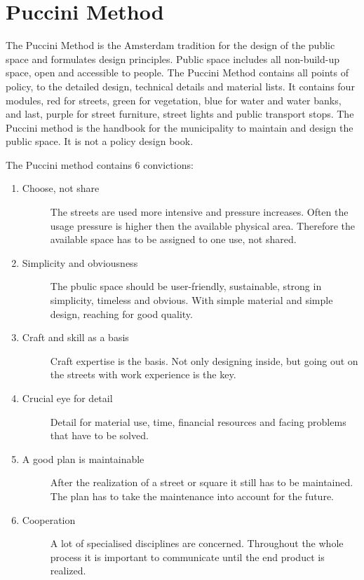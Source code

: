 \section{Puccini Method}\label{puccini}
The Puccini Method is the Amsterdam tradition for the design of the public space and formulates design principles. Public space includes all non-build-up space, open and accessible to people. The Puccini Method contains all points of policy, to the detailed design, technical details and material lists. It contains four modules, red for streets, green for vegetation, blue for water and water banks, and last, purple for street furniture, street lights and public transport stops. 
The Puccini method is the handbook for the municipality to maintain and design the public space. It is not a policy design book.~\cite{puccini2014}

The Puccini method contains 6 convictions:~\cite{puccini2014}
\begin{enumerate}
\item 	\begin{description}
		\item[Choose, not share] 
		The streets are used more intensive and pressure increases. Often the usage pressure is higher then the available physical area. Therefore the available space has to be assigned to one use, not shared. 
		\end{description}
\item \begin{description}
		\item[Simplicity and obviousness] 
		The pbulic space should be user-friendly, sustainable, strong in simplicity, timeless and obvious. With simple material and simple design, reaching for good quality.
		\end{description}
\item \begin{description}
		\item[Craft and skill as a basis] Craft expertise is the basis. Not only designing inside, but going out on the streets with work experience is the key. 
		\end{description}
\item \begin{description}
		\item[Crucial eye for detail] Detail for material use, time, financial resources and facing problems that have to be solved. 
		\end{description}
\item \begin{description}
		\item[A good plan is maintainable] After the realization of a street or square it still has to be maintained. The plan has to take the maintenance into account for the future. 
		\end{description}
\item \begin{description}
		\item[Cooperation] A lot of specialised disciplines are concerned. Throughout the whole process it is important to communicate until the end product is realized. 
		\end{description}
\end{enumerate}


